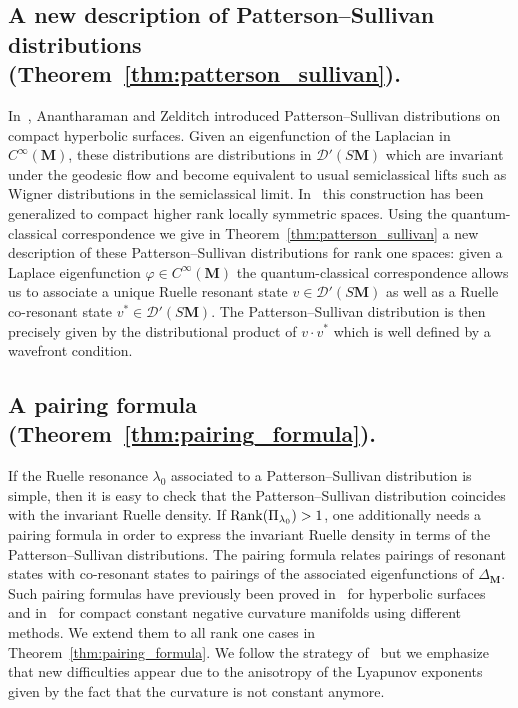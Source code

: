 \documentclass[AHL, Unicode, longabstracts, published]{cedram}
\newcommand{\bfm}{\mathbf{M}}
\newcommand{\la}{\lambda}
\begin{document}
\subsection{A new description of Patterson--Sullivan distributions (Theorem~\ref{thm:patterson_sullivan}).}

In~\cite{AZ07}, Anantharaman and Zelditch introduced Patterson--Sullivan distributions on compact hyperbolic surfaces. Given an eigenfunction of the Laplacian in $C^ \infty(\mathbf M)$, these distributions are distributions in $\mathcal D'(S\mathbf M)$ which are invariant under the geodesic flow and become equivalent to usual semiclassical lifts such as Wigner distributions in the semiclassical limit. In~\cite{HHS12} this construction has been generalized to compact higher rank locally symmetric spaces. Using the quantum-classical correspondence we give in Theorem~\ref{thm:patterson_sullivan} a new description of these Patterson--Sullivan distributions for rank one spaces: given a Laplace eigenfunction $\varphi\in C^ \infty(\mathbf M)$ the quantum-classical correspondence allows us to associate a unique Ruelle resonant state $v\in \mathcal D'(S\mathbf M)$ as well as a Ruelle co-resonant state $v^* \in\mathcal D'(S\mathbf M)$. The Patterson--Sullivan distribution is then precisely given by the distributional product of $v\cdot v^*$ which is well defined by a wavefront condition.



\subsection{A pairing formula (Theorem~\ref{thm:pairing_formula}).}
If the Ruelle resonance $\la_0$ associated to a Patterson--Sullivan distribution is simple, then it is easy to check that the Patterson--Sullivan distribution coincides with the invariant Ruelle density. If ${\rm Rank}(\Pi_{\la_0})>1$, one additionally needs a pairing formula in order to express the invariant Ruelle density in terms of the Patterson--Sullivan distributions. The pairing formula relates pairings of resonant states with co-resonant states to pairings of the associated eigenfunctions of $\Delta_{\bfm}$. Such pairing formulas have previously been proved in~\cite{AZ07} for hyperbolic surfaces and in~\cite{DFG15} for compact constant negative curvature manifolds using different methods. We extend them to all rank one cases in Theorem~\ref{thm:pairing_formula}. We follow the strategy of~\cite{DFG15} but we emphasize that new difficulties appear due to the anisotropy of the Lyapunov exponents given by the fact that the curvature is not constant anymore.
\end{document}
